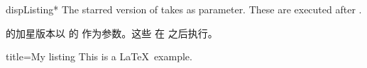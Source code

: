 \begin{docEnvironment}{dispListing*}{}
The starred version of  takes  
as parameter. These  are executed after .

 的加星版本以  的  作为参数。这些  在  之后执行。
\begin{dispExample}
\begin{dispListing*}{title=My listing}
This is a \LaTeX\ example.
\end{dispListing*}
\end{dispExample}
\end{docEnvironment}







